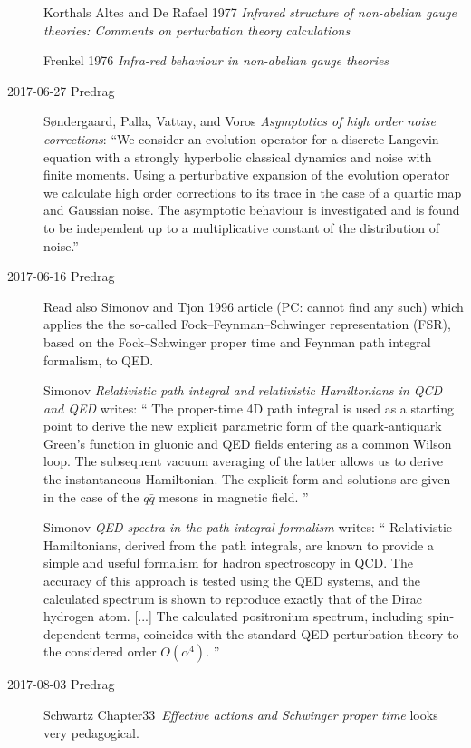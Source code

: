 \begin{description}
Korthals Altes and De Rafael 1977
{\em Infrared structure of non-abelian gauge theories:
    {Comments} on perturbation theory calculations}

Frenkel \etal{} 1976
{\em Infra-red behaviour in non-abelian gauge theories}


\item[2017-06-27 Predrag]
S{\o}ndergaard, Palla,  Vattay, and Voros
{\em Asymptotics of high order noise corrections}:
``We consider an evolution operator for a discrete Langevin equation with a
strongly hyperbolic classical dynamics and noise with finite moments.
Using a perturbative expansion of the evolution operator we calculate
high order corrections to its trace in the case of a quartic map and
Gaussian noise. The asymptotic behaviour is investigated and is found to
be independent up to a multiplicative constant of the distribution of
noise.''


\item[2017-06-16 Predrag]
Read also Simonov and Tjon 1996 article (PC: cannot find any such) which applies
the the so-called Fock–Feynman–Schwinger representation (FSR), based on the
Fock–Schwinger proper time and Feynman path integral formalism,
to QED.



Simonov
{\em Relativistic path integral and relativistic {Hamiltonians}
in {QCD and QED}} writes:
``
The proper-time 4D path integral is used as a starting point to derive
the new explicit parametric form of the quark-antiquark Green's function
in gluonic and QED fields entering as a common Wilson loop. The
subsequent vacuum averaging of the latter allows us to derive the
instantaneous Hamiltonian. The explicit form and solutions are given in
the case of the $q\bar{q}$ mesons in magnetic field.
''

Simonov
{\em {QED} spectra in the path integral formalism} writes:
``
Relativistic Hamiltonians, derived from the path integrals, are known to
provide a simple and useful formalism for hadron spectroscopy in QCD. The
accuracy of this approach is tested using the QED systems, and the
calculated spectrum is shown to reproduce exactly that of the Dirac
hydrogen atom. [...] The calculated positronium spectrum, including
spin-dependent terms, coincides with the standard QED perturbation theory
to the considered order $O(\alpha^4)$.
''

\item[2017-08-03 Predrag]
Schwartz
{Chapter33}~{\em Effective actions and Schwinger
proper time} looks very pedagogical.


\end{description}

